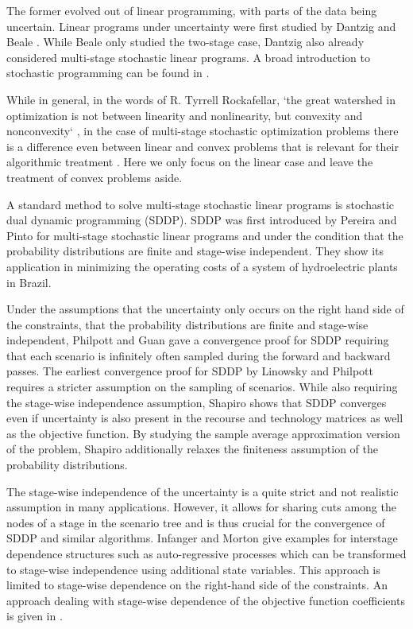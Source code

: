 \documentclass[a4paper,12pt]{article}
\begin{document}
The former evolved out of linear programming, with parts of the data being uncertain. Linear programs under uncertainty were first studied by Dantzig \cite{dantzig1955linear} and Beale \cite{beale1955minimizing}. While Beale only studied the two-stage case, Dantzig also already considered multi-stage stochastic linear programs. A broad introduction to stochastic programming can be found in \cite{birge2011introduction}.

While in general, in the words of R. Tyrrell Rockafellar, `the great watershed in optimization is not between linearity and nonlinearity, but convexity and nonconvexity` \cite{rockafellar1993lagrange}, in the case of multi-stage stochastic optimization problems there is a difference even between linear and convex problems that is relevant for their algorithmic treatment \cite{girardeau2015convergence}. Here we only focus on the linear case and leave the treatment of convex problems aside.

A standard method to solve multi-stage stochastic linear programs is stochastic dual dynamic programming (SDDP). SDDP was first introduced by Pereira and Pinto \cite{pereira1991multi} for multi-stage stochastic linear programs and under the condition that the probability distributions are finite and stage-wise independent. They show its application in minimizing the operating costs of a system of hydroelectric plants in Brazil.

Under the assumptions that the uncertainty only occurs on the right hand side of the constraints, that the probability distributions are finite and stage-wise independent, Philpott and Guan \cite{philpott2008convergence} gave a convergence proof for SDDP requiring that each scenario is infinitely often sampled during the forward and backward passes. The earliest convergence proof for SDDP by Linowsky and Philpott \cite{linowsky2005convergence} requires a stricter assumption on the sampling of scenarios.
While also requiring the stage-wise independence assumption, Shapiro \cite{shapiro2011analysis} shows that SDDP converges even if uncertainty is also present in the recourse and technology matrices as well as the objective function. By studying the sample average approximation version of the problem, Shapiro additionally relaxes the finiteness assumption of the probability distributions.

The stage-wise independence of the uncertainty is a quite strict and not realistic assumption in many applications. However, it allows for sharing cuts among the nodes of a stage in the scenario tree and is thus crucial for the convergence of SDDP and similar algorithms. Infanger and Morton \cite{infanger1996cut} give examples for interstage dependence structures such as auto-regressive processes which can be transformed to stage-wise independence using additional state variables. This approach is limited to stage-wise dependence on the right-hand side of the constraints. An approach dealing with stage-wise dependence of the objective function coefficients is given in \cite{downward2020stochastic}.
\end{document}
